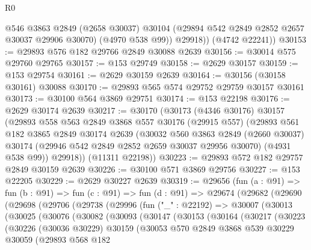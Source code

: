 \begin{lexlean}{R0}
\begin{coremodule}
            @546
            @3863
            @2849
            (@2658 @30037)
            @30104
            (@29894 @542 @2849 @2852 @2657 @30037 @29906 @30070)
            (@4970 @538 @99))
          @29918))
      (@4742 @22241))
@30153 := @29893 @576 @182 @29766 @2849 @30088 @2639
@30156 := @30014 @575 @29760 @29765
@30157 := @153 @29749
@30158 := @2629 @30157
@30159 := @153 @29754
@30161 := @2629 @30159 @2639
@30164 := @30156 (@30158 @30161) @30088
@30170 := @29893 @565 @574 @29752 @29759 @30157 @30161
@30173 := @30100 @564 @3869 @29751
@30174 := @153 @22198
@30176 := @2629 @30174 @2639
@30217 := @30170
    (@30173
      (@4346 @30176)
      @30157
      (@29893
        @558
        @563
        @2849
        @3868
        @557
        @30176
        (@29915 @557)
        (@29893
          @561
          @182
          @3865
          @2849
          @30174
          @2639
          (@30032
            @560
            @3863
            @2849
            (@2660 @30037)
            @30174
            (@29946 @542 @2849 @2852 @2659 @30037 @29956 @30070)
            (@4931 @538 @99))
          @29918))
      (@11311 @22198))
@30223 := @29893 @572 @182 @29757 @2849 @30159 @2639
@30226 := @30100 @571 @3869 @29756
@30227 := @153 @22205
@30229 := @2629 @30227 @2639
@30319 := @29656
    (fun (a : @91) =>
    fun (b : @91) =>
    fun (c : @91) =>
    fun (d : @91) =>
    @29674
      (@29682
        (@29690
          (@29698
            (@29706
              (@29738
                (@29996
                  (fun ("_" : @22192) =>
                  @30007
                    (@30013
                      (@30025
                        (@30076
                          (@30082
                            (@30093
                              (@30147
                                (@30153
                                  (@30164
                                    (@30217
                                      (@30223
                                        (@30226
                                          (@30036 @30229)
                                          @30159
                                          (@30053
                                            @570
                                            @2849
                                            @3868
                                            @539
                                            @30229
                                            @30059
                                            (@29893
                                              @568
                                              @182

\end{coremodule}
\end{lexlean}
